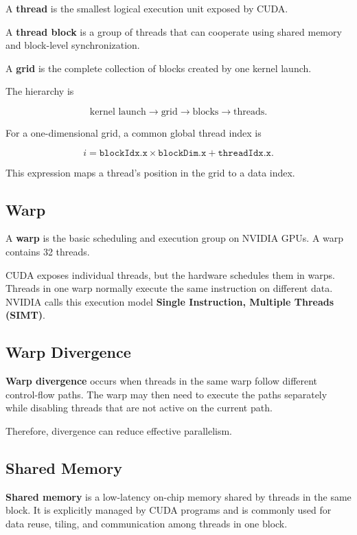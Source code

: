 \documentclass[11pt,a4paper]{article}
\begin{document}
A \textbf{thread} is the smallest logical execution unit exposed by CUDA.

A \textbf{thread block} is a group of threads that can cooperate using shared memory and block-level synchronization.

A \textbf{grid} is the complete collection of blocks created by one kernel launch.

The hierarchy is

\[
\text{kernel launch}
\rightarrow
\text{grid}
\rightarrow
\text{blocks}
\rightarrow
\text{threads}.
\]

For a one-dimensional grid, a common global thread index is

\[
i
=
\texttt{blockIdx.x}\times\texttt{blockDim.x}
+
\texttt{threadIdx.x}.
\]

This expression maps a thread's position in the grid to a data index.

\subsection{Warp}

A \textbf{warp} is the basic scheduling and execution group on NVIDIA GPUs. A warp contains 32 threads.

CUDA exposes individual threads, but the hardware schedules them in warps. Threads in one warp normally execute the same instruction on different data. NVIDIA calls this execution model \textbf{Single Instruction, Multiple Threads (SIMT)}.

\subsection{Warp Divergence}

\textbf{Warp divergence} occurs when threads in the same warp follow different control-flow paths. The warp may then need to execute the paths separately while disabling threads that are not active on the current path.

Therefore, divergence can reduce effective parallelism.

\subsection{Shared Memory}

\textbf{Shared memory} is a low-latency on-chip memory shared by threads in the same block. It is explicitly managed by CUDA programs and is commonly used for data reuse, tiling, and communication among threads in one block.
\end{document}
